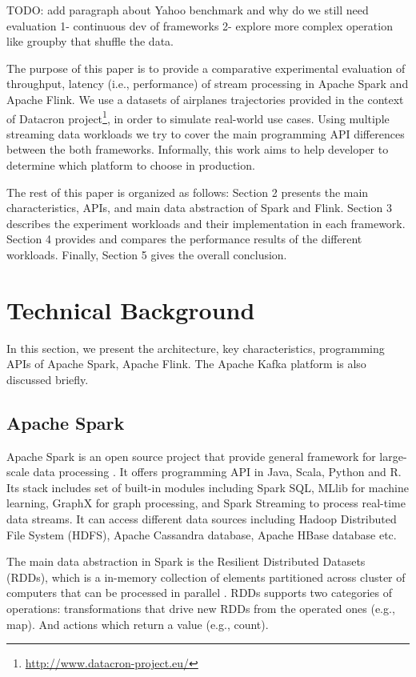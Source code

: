 \documentclass[]{article}
\begin{document}
\par TODO: add paragraph about Yahoo benchmark and why do we still need evaluation 1- continuous dev of frameworks 2- explore more complex operation like groupby that shuffle the data.
\par The purpose of this paper is to provide a comparative experimental evaluation of throughput, latency (i.e., performance) of stream processing in Apache Spark and Apache Flink. We use a datasets of airplanes trajectories provided in the context of Datacron project\footnote{\url{http://www.datacron-project.eu/}}, in order to simulate real-world use cases. Using multiple streaming data workloads we try to cover the main programming API differences between the both frameworks. Informally,  this work aims to help developer to determine which platform to choose in production. 

\par The rest of this paper is organized as follows: Section 2
presents the main characteristics, APIs, and main data abstraction of Spark and Flink. Section 3  describes the experiment workloads and their implementation in each framework. Section 4
provides and compares the performance results of the different workloads. Finally, Section 5 gives the overall conclusion.

\section{Technical Background}
 In this section, we present the architecture, key characteristics, programming APIs  of Apache Spark, Apache Flink. The Apache Kafka platform is also discussed briefly.

\subsection{Apache Spark}

\par Apache Spark is an open source project that provide general framework for large-scale data processing \cite{spark}. It offers programming API in Java, Scala, Python and R. Its stack includes set of built-in modules including Spark SQL, MLlib for machine learning, GraphX for graph processing, and Spark Streaming to process real-time data streams. It can access different data sources including Hadoop Distributed File System (HDFS), Apache Cassandra database, Apache HBase database etc.

\par The main data abstraction in Spark is the Resilient Distributed Datasets (RDDs), which is a in-memory collection of elements partitioned across cluster of computers that can be processed in parallel \cite{rdd}. RDDs supports two categories of operations: transformations that drive new RDDs from the operated ones (e.g., map).  And actions which return a value (e.g., count).
\end{document}
